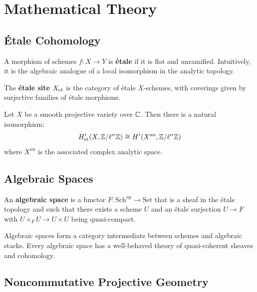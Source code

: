 \section{Mathematical Theory}

\subsection{\'Etale Cohomology}

\begin{definition}
A morphism of schemes $f: X \to Y$ is \textbf{\'etale} if it is flat and unramified. Intuitively, it is the algebraic analogue of a local isomorphism in the analytic topology.
\end{definition}

\begin{definition}
The \textbf{\'etale site} $X_{\operatorname{et}}$ is the category of \'etale $X$-schemes, with coverings given by surjective families of \'etale morphisms.
\end{definition}

\begin{theorem}
Let $X$ be a smooth projective variety over $\mathbb{C}$. Then there is a natural isomorphism:
\[
H^i_{\operatorname{et}}(X, \mathbb{Z}/\ell^n\mathbb{Z}) \cong H^i(X^{\mathrm{an}}, \mathbb{Z}/\ell^n\mathbb{Z})
\]
where $X^{\mathrm{an}}$ is the associated complex analytic space.
\end{theorem}

\subsection{Algebraic Spaces}

\begin{definition}
An \textbf{algebraic space} is a functor $F: \mathrm{Sch}^{\mathrm{op}} \to \mathrm{Set}$ that is a sheaf in the \'etale topology and such that there exists a scheme $U$ and an \'etale surjection $U \to F$ with $U \times_F U \to U \times U$ being quasi-compact.
\end{definition}

Algebraic spaces form a category intermediate between schemes and algebraic stacks. Every algebraic space has a well-behaved theory of quasi-coherent sheaves and cohomology.

\subsection{Noncommutative Projective Geometry}

